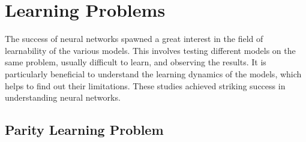 \documentclass[a4paper, nobind]{templates/ociamthesis}
\begin{document}
\hypertarget{chap:chapter_2}{%
\chapter{Learning Problems}\label{chap:chapter_2}}

\minitoc 

\noindent The success of neural networks spawned a great interest in the field of learnability of the various models. This involves testing different models on the same problem, usually difficult to learn, and observing the results. It is particularly beneficial to understand the learning dynamics of the models, which helps to find out their limitations. These studies achieved striking success in understanding neural networks.

\hypertarget{parity-learning-problem}{%
\section{Parity Learning Problem}\label{parity-learning-problem}}
\end{document}
